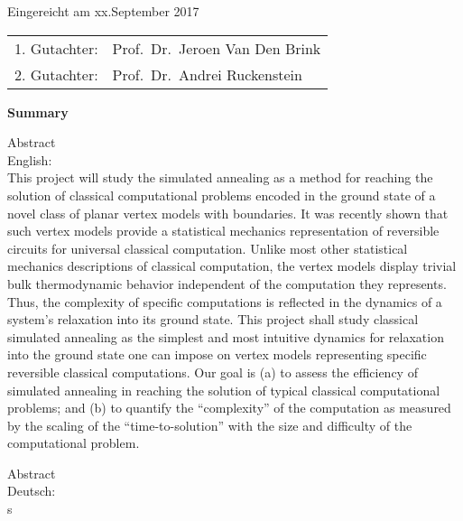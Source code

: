 \thispagestyle{empty}\vspace*{48em}

Eingereicht am xx.September 2017\vspace{1.5em}
\par{\large\begin{tabular}{ll}
 1. Gutachter: & Prof.~Dr.~Jeroen Van Den Brink \\
 2. Gutachter: & Prof.~Dr.~Andrei Ruckenstein \\
 \end{tabular}}


\newpage
\begin{center}\large\bfseries Summary\end{center}

Abstract \\
English: \\
This project will study the simulated annealing as a method for reaching the solution of classical computational problems encoded in the ground state of a novel class of planar vertex models with boundaries. It was recently shown that such vertex models provide a statistical mechanics representation of reversible circuits for universal classical computation. Unlike most other statistical mechanics descriptions of classical computation, the vertex models display trivial bulk thermodynamic behavior independent of the computation they represents. Thus,  the complexity of specific computations is reflected in the dynamics of a system's relaxation into its ground state. This project shall study classical simulated annealing as the simplest and most intuitive dynamics for relaxation into the ground state one can  impose on vertex models representing specific reversible classical computations. Our goal is (a) to assess the efficiency of simulated annealing in reaching the solution of typical classical computational problems;  and (b) to quantify the ``complexity'' of the computation as measured by the scaling of the ``time-to-solution'' with the size and difficulty of the computational problem.


\vspace{10em}
Abstract \\
Deutsch: \\
s


\tableofcontents







